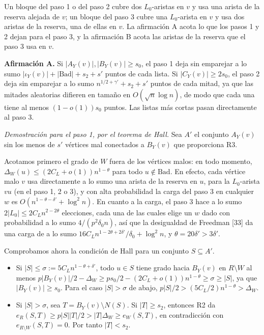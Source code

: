 \documentclass[spanish,11pt,a4paper]{article}
\providecommand{\tightlist}{\setlength{\itemsep}{0pt}\setlength{\parskip}{0pt}}
\begin{document}
Un bloque del paso 1 o del paso 2 cubre dos \(L_0\)-aristas en \(v\) y usa una arista de la reserva alejada de \(v\); un bloque del paso 3 cubre una \(L_0\)-arista en \(v\) y usa dos aristas de la reserva, una de ellas en \(v\). La afirmación A acota lo que los pasos 1 y 2 dejan para el paso 3, y la afirmación B acota las aristas de la reserva que el paso 3 usa en \(v\).

\textbf{Afirmación A.} Si \(|A_Y(v)|,|B_Y(v)|\ge s_0\), el paso 1 deja sin emparejar a lo sumo \(|\iota_Y(v)|+|\mathrm{Bad}|+s_2+s'\) puntos de cada lista. Si \(|C_Y(v)|\ge2s_0\), el paso 2 deja sin emparejar a lo sumo \(n^{1/2+\gamma'}+s_2+s'\) puntos de cada mitad, ya que las mitades aleatorias difieren en tamaño en \(O(\sqrt n\log n)\), de modo que cada una tiene al menos \((1-o(1))s_0\) puntos. Las listas más cortas pasan directamente al paso 3.

\emph{Demostración para el paso 1, por el teorema de Hall.} Sea \(A'\) el conjunto \(A_Y(v)\) sin los menos de \(s'\) vértices mal conectados a \(B_Y(v)\) que proporciona R3.

Acotamos primero el grado de \(W\) fuera de los vértices malos: en todo momento, \(\Delta_W(u)\le(2C_L+o(1))n^{1-\theta}\) para todo \(u\notin\mathrm{Bad}\). En efecto, cada vértice malo \(v\) usa directamente a lo sumo una arista de la reserva en \(u\), para la \(L_0\)-arista \(vu\) (en el paso 1, 2 o 3), y con alta probabilidad la carga del paso 3 en cualquier \(w\) es \(O(n^{1-\theta-\delta'}+\log^2n)\). En cuanto a la carga, el paso 3 hace a lo sumo \(2|L_0|\le2C_Ln^{2-2\theta}\) elecciones, cada una de las cuales elige un \(w\) dado con probabilidad a lo sumo \(4/(p^2\delta_0n)\), así que la desigualdad de Freedman {[}33{]} da una carga de a lo sumo \(16C_Ln^{1-2\theta+2\delta'}/\delta_0+\log^2n\), y \(\theta=20\delta'>3\delta'\).

Comprobamos ahora la condición de Hall para un conjunto \(S\subseteq A'\).

\begin{itemize}
\tightlist
\item
  Si \(|S|\le\sigma:=5C_Ln^{1-\theta+\delta'}\), todo \(u\in S\) tiene grado hacia \(B_Y(v)\) en \(R\setminus W\) al menos \(p|B_Y(v)|/2-\Delta_W\ge ps_0/2-(2C_L+o(1))n^{1-\theta}\ge\sigma\ge|S|\), ya que \(|B_Y(v)|\ge s_0\). Para el caso \(|S|>\sigma\) de abajo, \(p|S|/2>(5C_L/2)n^{1-\theta}>\Delta_W\).
\item
  Si \(|S|>\sigma\), sea \(T=B_Y(v)\setminus N(S)\). Si \(|T|\ge s_2\), entonces R2 da \(e_R(S,T)\ge p|S||T|/2>|T|\Delta_W\ge e_W(S,T)\), en contradicción con \(e_{R\setminus W}(S,T)=0\). Por tanto \(|T|<s_2\).
\end{itemize}
\end{document}
